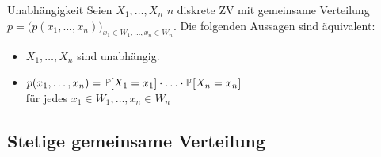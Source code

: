 \begin{tprop}{Unabhängigkeit}
	Seien $X_1 , \ldots , X_n$ $n$ diskrete ZV mit gemeinsame Verteilung $p = \big( p(x_1 , \ldots , x_n)\big)_{x_1 \in W_1 ,
	\ldots , x_n \in W_n}$. Die folgenden Aussagen sind äquivalent:
	\begin{itemize}
		\item $X_1 , \ldots , X_n$ sind unabhängig.
		\item $p (x_1 , \ldots , x_n) = \mathbb{P} [X_1 = x_1] \cdot \ldots \cdot \mathbb{P}[X_n = x_n]$ \\ für jedes $x_1 \in W_1 , \ldots
			, x_n \in W_n$
	\end{itemize}
\end{tprop}


\subsection{Stetige gemeinsame Verteilung}%
\label{sub:stetige_gemeinsame_verteilung}

